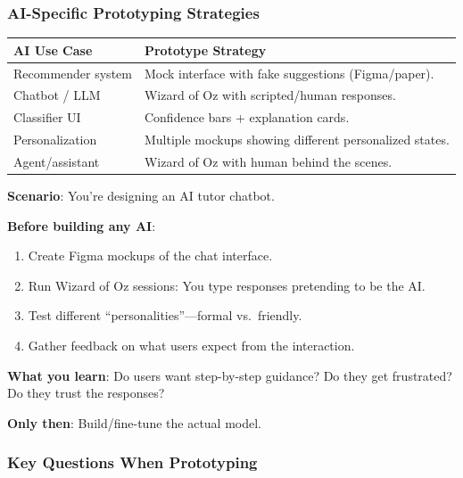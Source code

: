 \subsubsection*{AI-Specific Prototyping Strategies}

\begin{center}
\renewcommand{\arraystretch}{1.3}
\begin{tabular}{@{} l p{8cm} @{}}
\toprule
\textbf{AI Use Case} & \textbf{Prototype Strategy} \\
\midrule
Recommender system & Mock interface with fake suggestions (Figma/paper). \\
Chatbot / LLM & Wizard of Oz with scripted/human responses. \\
Classifier UI & Confidence bars + explanation cards. \\
Personalization & Multiple mockups showing different personalized states. \\
Agent/assistant & Wizard of Oz with human behind the scenes. \\
\bottomrule
\end{tabular}
\end{center}

\begin{exbox}
\textbf{Scenario}: You're designing an AI tutor chatbot.

\textbf{Before building any AI}:
\begin{enumerate}
  \item Create Figma mockups of the chat interface.
  \item Run Wizard of Oz sessions: You type responses pretending to be the AI.
  \item Test different ``personalities''---formal vs.\ friendly.
  \item Gather feedback on what users expect from the interaction.
\end{enumerate}

\textbf{What you learn}: Do users want step-by-step guidance? Do they get frustrated? Do they trust the responses?

\textbf{Only then}: Build/fine-tune the actual model.
\end{exbox}

\subsubsection*{Key Questions When Prototyping}


